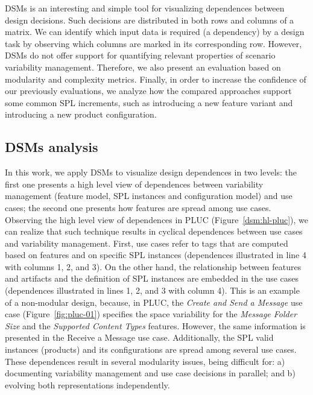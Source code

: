 \documentclass{acm_proc_article-sp}
\begin{document}
DSMs is an interesting and simple tool for visualizing dependences between design decisions. Such decisions are distributed in both rows and columns of a matrix. We can identify which input data is required (a dependency) by a design task by observing which columns are marked in its corresponding row. However, DSMs do not offer support for 
quantifying relevant properties of scenario variability management. Therefore, we also present an evaluation based on modularity and 
complexity metrics. Finally, in order to increase the confidence of our previously evaluations, we analyze how the compared approaches support 
some common SPL increments, such as introducing a new feature variant and introducing a new product configuration. 

\subsection{DSMs analysis}
\label{dsm-analysis}

In this work, we apply DSMs to visualize 
design dependences in two levels: the first one presents a high level view of dependences between variability
management (feature model, SPL instances and configuration model) and use cases; the second
one presents how features are spread among use cases. 
Observing the high level view of dependences in PLUC (Figure~\ref{dsm:hl-pluc}),  
we can realize that such technique results in cyclical dependences between use cases and variability
management. First, use cases refer to tags that are computed based on features and on specific 
SPL instances (dependences illustrated in line 4 with columns 1, 2, and 3). On the other hand, the relationship between 
features and artifacts and the definition of SPL instances are embedded in the use cases (dependences illustrated in lines 1, 2, 
and 3 with column 4). 
This is an example of a non-modular design, because, in PLUC,
the \emph{Create and Send a Message} use case (Figure~\ref{fig:pluc-01})
specifies the space variability for the \emph{Message Folder Size} and the \emph{Supported Content
Types} features. However, the same information is presented in the Receive a Message use case.
Additionally, the SPL valid instances (products) and its configurations are spread among
several use cases. These dependences result in several modularity issues, being difficult for: a) documenting variability
management and use case decisions in parallel; and b) evolving both representations independently.
\end{document}
